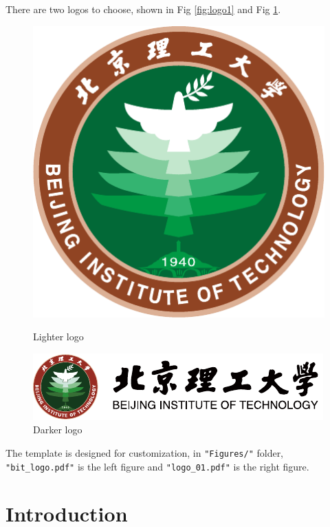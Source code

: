 \documentclass[12pt,english, openany]{article}
\begin{document}
There are two logos to choose, shown in Fig \ref{fig:logo1} and Fig \ref{fig:logo2}. 
\begin{figure}[ht]
	\centering
	\begin{minipage}[c]{0.4\linewidth}
		\includegraphics[width=0.9\linewidth]{Figures/bit_logo.pdf}
		\caption{Lighter logo}
		\label{fig:logo1}
	\end{minipage}
	\hspace{1.4cm}
	\begin{minipage}[c]{0.4\linewidth}
		\includegraphics[width=0.9\linewidth]{Figures/logo_01.pdf}
		\caption{Darker logo}
		\label{fig:logo2}
	\end{minipage}%
\end{figure}

The template is designed for customization, in \texttt{"Figures/"} folder, \texttt{"bit\_logo.pdf"} is the left figure and \texttt{"logo\_01.pdf"} is the right figure.

\chapter{Introduction}\label{chapt:intro}
\end{document}
